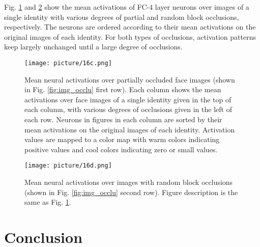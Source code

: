 \documentclass[10pt,twocolumn,letterpaper]{article}
\begin{document}
Fig. \ref{fig:act_occlu_part} and \ref{fig:act_occlu_rb} show the mean activations of FC-$4$ layer neurons over images of a single identity with various degrees of partial and random block occlusions, respectively. The neurons are ordered according to their mean activations on the original images of each identity. For both types of occlusions, activation patterns keep largely unchanged until a large degree of occlusions.

\begin{figure}[t]
\begin{center}
\texttt{[image: picture/16c.png]}
\end{center}
\vspace{-0.1in}
\caption{Mean neural activations over partially occluded face images (shown in Fig. \ref{fig:img_occlu} first row). Each column shows the mean activations over face images of a single identity given in the top of each column, with various degrees of occlusions given in the left of each row. Neurons in figures in each column are sorted by their mean activations on the original images of each identity. Activation values are mapped to a color map with warm colors indicating positive values and cool colors indicating zero or small values.}
\label{fig:act_occlu_part}
\vspace{-0.05in}
\end{figure}

\begin{figure}[t]
\begin{center}
\texttt{[image: picture/16d.png]}
\end{center}
\vspace{-0.1in}
\caption{Mean neural activations over images with random block occlusions (shown in Fig. \ref{fig:img_occlu} second row). Figure description is the same as Fig. \ref{fig:act_occlu_part}.}
\label{fig:act_occlu_rb}
\vspace{-0.05in}
\end{figure}


\section{Conclusion}
\end{document}
